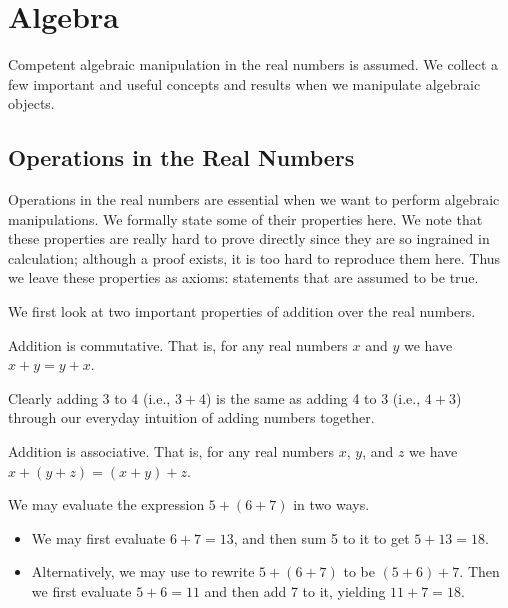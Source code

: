 \chapter{Algebra}
Competent algebraic manipulation in the real numbers is assumed. We collect a few important and useful concepts and results when we manipulate algebraic objects.

\section{Operations in the Real Numbers}
Operations in the real numbers are essential when we want to perform algebraic manipulations. We formally state some of their properties here. We note that these properties are really hard to prove directly since they are so ingrained in calculation; although a proof exists, it is too hard to reproduce them here. Thus we leave these properties as axioms: statements that are assumed to be true.

We first look at two important properties of addition over the real numbers.

\begin{axiom}\label{axiom-addition-is-commutative}
    Addition is commutative. That is, for any real numbers $x$ and $y$ we have $x + y = y + x$.
\end{axiom}

\begin{example}
    Clearly adding 3 to 4 (i.e., $3 + 4$) is the same as adding 4 to 3 (i.e., $4 + 3$) through our everyday intuition of adding numbers together.
\end{example}

\begin{axiom}\label{axiom-addition-is-associative}
    Addition is associative. That is, for any real numbers $x$, $y$, and $z$ we have $x+(y+z) = (x+y)+z$.
\end{axiom}

\begin{example}
    We may evaluate the expression $5+(6+7)$ in two ways.
    \begin{itemize}
        \item We may first evaluate $6+7 = 13$, and then sum 5 to it to get $5 + 13 = 18$.
        \item Alternatively, we may use  to rewrite $5+(6+7)$ to be $(5+6)+7$. Then we first evaluate $5+6 = 11$ and then add 7 to it, yielding $11 + 7 = 18$.
    \end{itemize}
\end{example}

